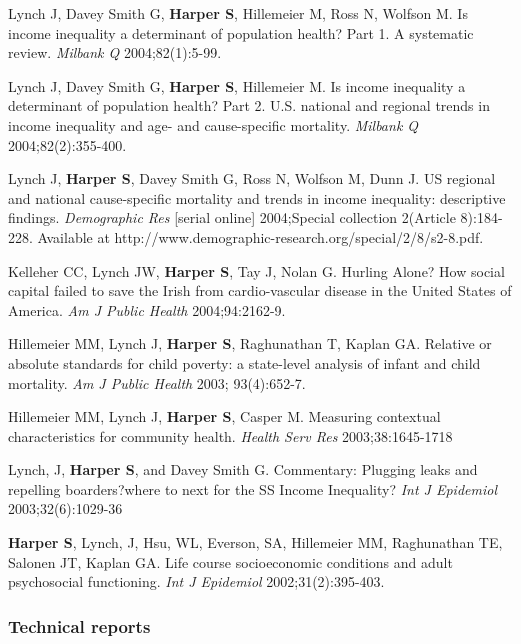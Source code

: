 \documentclass[
  letterpaper,
  DIV=11,
  numbers=noendperiod]{scrartcl}
\begin{document}
\begin{etaremune}
\item Lynch J, Davey Smith G, \textbf{Harper S}, Hillemeier M, Ross N, Wolfson M. Is income inequality a determinant of population health? Part 1. A systematic review. \emph{Milbank Q} 2004;82(1):5-99.
 
\item Lynch J, Davey Smith G, \textbf{Harper S}, Hillemeier M.  Is income inequality a determinant of population health? Part 2. U.S. national and regional trends in income inequality and age- and cause-specific mortality. \emph{Milbank Q} 2004;82(2):355-400.
 
\item Lynch J, \textbf{Harper S}, Davey Smith G, Ross N, Wolfson M, Dunn J. US regional and national cause-specific mortality and trends in income inequality: descriptive findings. \emph{Demographic Res} [serial online] 2004;Special collection 2(Article 8):184-228. Available at http://www.demographic-research.org/special/2/8/s2-8.pdf.
 
\item Kelleher CC, Lynch JW, \textbf{Harper S}, Tay J, Nolan G.  Hurling Alone? How social capital failed to save the Irish from cardio-vascular disease in the United States of America.  \emph{Am J Public Health} 2004;94:2162-9.
 
\item Hillemeier MM, Lynch J, \textbf{Harper S}, Raghunathan T, Kaplan GA. Relative or absolute standards for child poverty: a state-level analysis of infant and child mortality. \emph{Am J Public Health} 2003; 93(4):652-7.
 
\item Hillemeier MM, Lynch J, \textbf{Harper S}, Casper M. Measuring contextual characteristics for community health.  \emph{Health Serv Res} 2003;38:1645-1718 
 
\item Lynch, J, \textbf{Harper S}, and Davey Smith G. Commentary: Plugging leaks and repelling boarders?where to next for the SS Income Inequality? \emph{Int J Epidemiol} 2003;32(6):1029-36

\item \textbf{Harper S}, Lynch, J, Hsu, WL, Everson, SA, Hillemeier MM, Raghunathan TE, Salonen JT,  Kaplan GA. Life course socioeconomic conditions and adult psychosocial functioning. \emph{Int J Epidemiol} 2002;31(2):395-403.

\end{etaremune}

\hypertarget{technical-reports}{%
\subsubsection{Technical reports}\label{technical-reports}}
\end{document}
